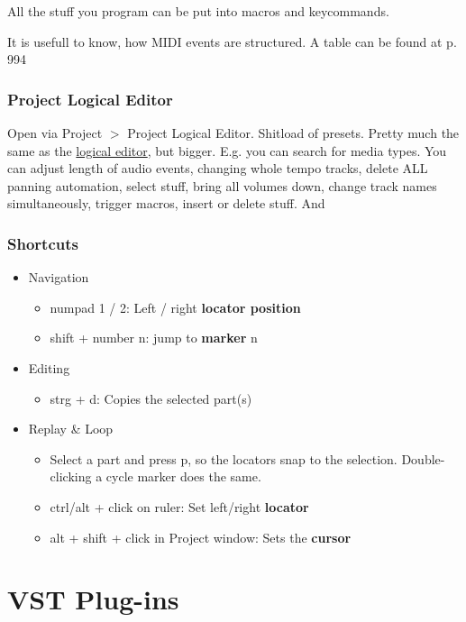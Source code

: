 \documentclass[10pt]{article}
\begin{document}
All the stuff you program can be put into macros and keycommands.

It is usefull to know, how MIDI events are structured. A table can be found at p. 994

\subsubsection{Project Logical Editor}

Open via Project $>$ Project Logical Editor. Shitload of presets. Pretty much the same as the \hyperlink{LogicalEditor}{logical editor}, but bigger. E.g. you can search for media types. You can adjust length of audio events, changing whole tempo tracks, delete ALL panning automation, select stuff, bring all volumes down, change track names simultaneously, trigger macros, insert or delete stuff. And 

\subsubsection{Shortcuts}

\begin{itemize}
	\item Navigation
	\begin{itemize}
		\item numpad 1 / 2: Left / right \textbf{locator position}
		\item shift + number n: jump to \textbf{marker} n
	\end{itemize}
	\item Editing
	\begin{itemize}
		\item strg + d: Copies the selected part(s)
	\end{itemize}
	\item Replay \& Loop
	\begin{itemize}
		\item Select a part and press p, so the locators snap to the selection. Double-clicking a cycle marker does the same.
		\item ctrl/alt + click on ruler: Set left/right \textbf{locator}
		\item alt + shift + click in Project window: Sets the \textbf{cursor}
	\end{itemize}
\end{itemize}

\section{VST Plug-ins}
\end{document}
